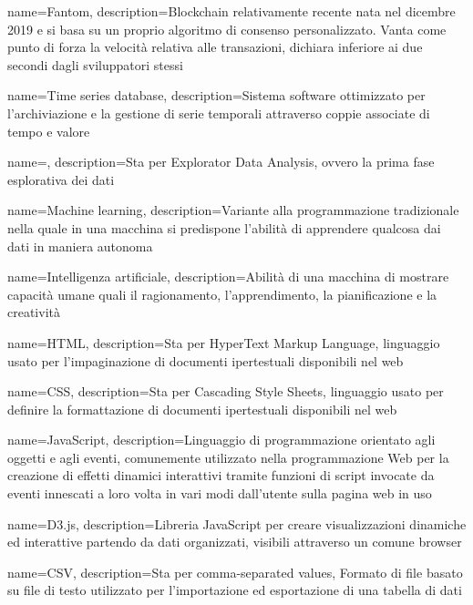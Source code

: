 {
	name={Fantom},
	description={Blockchain\glo{} relativamente recente nata nel dicembre 2019 e si basa su un proprio algoritmo di consenso personalizzato. Vanta come punto di forza la velocità relativa alle transazioni, dichiara inferiore ai due secondi dagli sviluppatori stessi}
}

{
	name={Time series database},
	description={Sistema software ottimizzato per l'archiviazione e la gestione di serie temporali attraverso coppie associate di tempo e valore}
}

\newglossaryentry{}
{
	name={},
	description={Sta per Explorator Data Analysis, ovvero la prima fase esplorativa dei dati}
}

{
	name={Machine learning},
	description={Variante alla programmazione tradizionale nella quale in una macchina si predispone l'abilità di apprendere qualcosa dai dati in maniera autonoma}
}

{
	name={Intelligenza artificiale},
	description={Abilità di una macchina di mostrare capacità umane quali il ragionamento, l'apprendimento, la pianificazione e la creatività}
}

{
	name={HTML},
	description={Sta per HyperText Markup Language, linguaggio usato per l'impaginazione di documenti ipertestuali disponibili nel web}
}

{
	name={CSS},
	description={Sta per Cascading Style Sheets, linguaggio usato per definire la formattazione di documenti ipertestuali disponibili nel web}
}

{
	name={JavaScript},
	description={Linguaggio di programmazione orientato agli oggetti e agli eventi, comunemente utilizzato nella programmazione Web per la creazione di effetti dinamici interattivi tramite funzioni di script invocate da eventi innescati a loro volta in vari modi dall'utente sulla pagina web in uso}
}

{
	name={D3.js},
	description={Libreria JavaScript per creare visualizzazioni dinamiche ed interattive partendo da dati organizzati, visibili attraverso un comune browser}
}

{
	name={CSV},
	description={Sta per comma-separated values, Formato di file basato su file di testo utilizzato per l'importazione ed esportazione di una tabella di dati}
}

